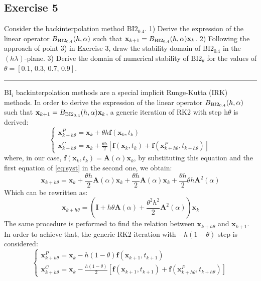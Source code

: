 \documentclass[11pt,a4paper,oneside]{article}
\renewcommand{\vec}[1]{\mathbf{#1}}
\begin{document}
\subsection*{Exercise 5}
Consider the backinterpolation method $\textrm{BI2}_{0.4}$. 1) Derive the expression of the 
linear operator $B_{\rm BI2_{0.4}}(h,\alpha)$ such that $\vec x_{k+1} = B_{\rm BI2_{0.4}}(h,\alpha) \vec x_k$. 2) 
Following the approach of point 3) in Exercise 3, draw the stability domain of 
$\textrm{BI2}_{0.4}$ in the $(h\lambda)$-plane. 3) Derive the domain of numerical stability 
of $\textrm{BI2}_{\theta}$ for the values of $\theta = [0.1,\, 0.3,\, 0.7,\, 0.9]$.

\medskip \hrule \medskip

BI$_i$ backinterpolation methods are a special implicit Runge-Kutta (IRK) methods. In order to derive the expression of the 
linear operator $B_{\rm BI2_{0.4}}(h,\alpha)$ such that $\vec x_{k+1} = B_{\rm BI2_{0.4}}(h,\alpha) \vec x_k$, a generic 
iteration of RK2 with step h$\theta$ is derived:
\begin{equation}
    \begin{cases}
        \vec{x}_{k+h\theta}^P = \vec{x}_k + \theta h\vec{f}(\vec{x}_k, t_k) \\
        \vec{x}_{k+h\theta}^C = \vec{x}_k + \frac{\theta h}{2}[\vec{f}(\vec{x}_k, t_k) + \vec{f}(\vec{x}_{k+h\theta}^P, t_{k+h\theta})]
\end{cases}
\label{eq:syst}
\end{equation}
where, in our case, $\vec{f}(\vec{x}_k, t_k)= \vec{A}(\alpha)\vec{x}_k$, by substituting this equation and the first equation of \autoref{eq:syst} in the second one, we obtain:
\begin{equation}
    \vec{x}_{k+h\theta} = \vec{x}_k + \frac{\theta h}{2}\vec{A}(\alpha)\vec{x}_k + \frac{\theta h}{2}\vec{A}(\alpha)\vec{x}_k + \frac{\theta h}{2}\theta h \vec{A}^2(\alpha)
\end{equation}
Which can be rewritten as:
\begin{equation}
    \vec{x}_{k+h\theta} = (\vec{I} + h\theta\vec{A}(\alpha) + \frac{\theta^2h^2}{2}\vec{A}^2(\alpha))\vec{x}_k
    \label{eq:eq1}
\end{equation}
The same procedure is performed to find the relation between $\vec{x}_{k+h\theta}$ and $\vec{x}_{k+1}$. In order to achieve that, the generic RK2 iteration with $-h(1-\theta)$ step is considered:
\begin{equation}
    \begin{cases}
        \vec{x}_{k+h\theta}^P = \vec{x}_k - h(1-\theta)\vec{f}(\vec{x}_{k+1}, t_{k+1}) \\
        \vec{x}_{k+h\theta}^C = \vec{x}_k - \frac{h(1-\theta)}{2}[\vec{f}(\vec{x}_{k+1}, t_{k+1}) + \vec{f}(\vec{x}_{k+h\theta}^P, t_{k+h\theta})]
\end{cases}
\label{eq:eq2}
\end{equation}
\end{document}
